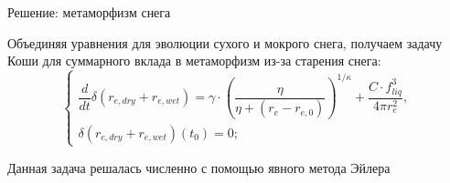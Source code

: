 \documentclass[unicode]{beamer}
\begin{document}
\begin{frame}{Решение: метаморфизм снега}

\footnotesize

Объединяя уравнения для эволюции сухого и мокрого снега, получаем задачу Коши для суммарного вклада в метаморфизм из-за старения снега:
    \[ \begin{cases}
        \dfrac{d}{dt} \delta (r_{e , dry} + r_{e , wet}) = \gamma \cdot \left(\dfrac{\eta}{\eta + (r_e - r_{e, 0})}\right)^{1 / \kappa} + \dfrac{C \cdot f_{liq}^3} {4 \pi r_{e}^2} ,
        \\
        \delta (r_{e , dry} + r_{e , wet})(t_0) = 0; 
    \end{cases} \]

Данная задача решалась численно с помощью явного метода Эйлера

\end{frame}
\end{document}
